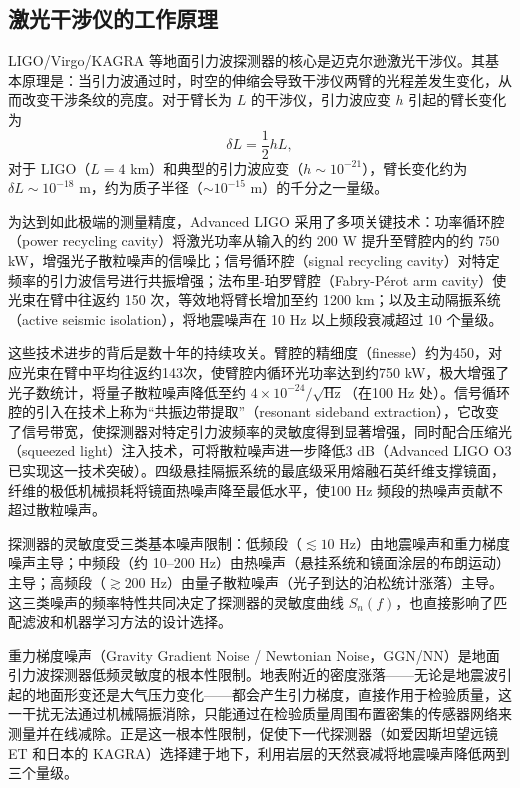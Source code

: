 \subsection{激光干涉仪的工作原理}

LIGO/Virgo/KAGRA 等地面引力波探测器的核心是迈克尔逊激光干涉仪。其基本原理是：当引力波通过时，时空的伸缩会导致干涉仪两臂的光程差发生变化，从而改变干涉条纹的亮度。对于臂长为 $L$ 的干涉仪，引力波应变 $h$ 引起的臂长变化为
\begin{equation}
  \delta L = \frac{1}{2} h L,
\end{equation}
对于 LIGO（$L = 4$ km）和典型的引力波应变（$h \sim 10^{-21}$），臂长变化约为 $\delta L \sim 10^{-18}$ m，约为质子半径（$\sim 10^{-15}$ m）的千分之一量级。

为达到如此极端的测量精度，Advanced LIGO 采用了多项关键技术：功率循环腔（power recycling cavity）将激光功率从输入的约 200 W 提升至臂腔内的约 750 kW，增强光子散粒噪声的信噪比；信号循环腔（signal recycling cavity）对特定频率的引力波信号进行共振增强；法布里-珀罗臂腔（Fabry-Pérot arm cavity）使光束在臂中往返约 150 次，等效地将臂长增加至约 1200 km；以及主动隔振系统（active seismic isolation），将地震噪声在 10 Hz 以上频段衰减超过 10 个量级。

这些技术进步的背后是数十年的持续攻关。臂腔的精细度（finesse）约为450，对应光束在臂中平均往返约143次，使臂腔内循环光功率达到约750 kW，极大增强了光子数统计，将量子散粒噪声降低至约 $4\times10^{-24}/\sqrt{\text{Hz}}$（在100 Hz 处）。信号循环腔的引入在技术上称为“共振边带提取”（resonant sideband extraction），它改变了信号带宽，使探测器对特定引力波频率的灵敏度得到显著增强，同时配合压缩光（squeezed light）注入技术，可将散粒噪声进一步降低3 dB（Advanced LIGO O3 已实现这一技术突破）。四级悬挂隔振系统的最底级采用熔融石英纤维支撑镜面，纤维的极低机械损耗将镜面热噪声降至最低水平，使100 Hz 频段的热噪声贡献不超过散粒噪声。

探测器的灵敏度受三类基本噪声限制：低频段（$\lesssim 10$ Hz）由地震噪声和重力梯度噪声主导；中频段（约 10--200 Hz）由热噪声（悬挂系统和镜面涂层的布朗运动）主导；高频段（$\gtrsim 200$ Hz）由量子散粒噪声（光子到达的泊松统计涨落）主导。这三类噪声的频率特性共同决定了探测器的灵敏度曲线 $S_n(f)$，也直接影响了匹配滤波和机器学习方法的设计选择。

重力梯度噪声（Gravity Gradient Noise / Newtonian Noise，GGN/NN）是地面引力波探测器低频灵敏度的根本性限制。地表附近的密度涨落——无论是地震波引起的地面形变还是大气压力变化——都会产生引力梯度，直接作用于检验质量，这一干扰无法通过机械隔振消除，只能通过在检验质量周围布置密集的传感器网络来测量并在线减除。正是这一根本性限制，促使下一代探测器（如爱因斯坦望远镜 ET 和日本的 KAGRA）选择建于地下，利用岩层的天然衰减将地震噪声降低两到三个量级。


